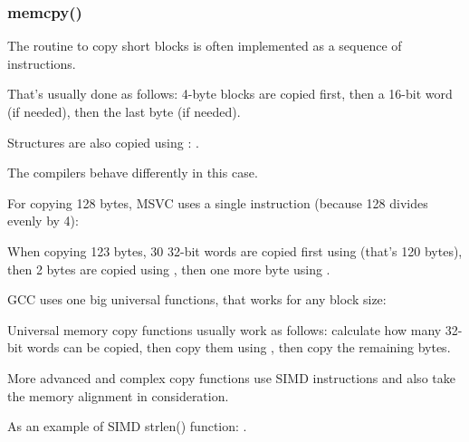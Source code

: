 \subsubsection{memcpy()}

\label{copying_short_blocks}


The routine to copy short blocks is often implemented as a sequence of \MOV instructions.








That's usually done as follows: 4-byte blocks are copied first, then a 16-bit word (if needed), 
then the last byte (if needed).

Structures are also copied using
\MOV: .


The compilers behave differently in this case.




For copying 128 bytes, MSVC uses a single  instruction (because 128 
divides evenly by 4):




When copying 123 bytes, 30 32-bit words are copied first using 
(that's 120 bytes),
then 2 bytes are copied using , 
then one more byte using .




GCC uses one big universal functions, that works for any block size:




Universal memory copy functions usually work as follows:
calculate how many 32-bit words can be copied, then copy them using , then copy
the remaining bytes.


More advanced and complex copy functions use \ac{SIMD} instructions and also take the memory alignment
in consideration.

As an example of SIMD strlen() function: .


